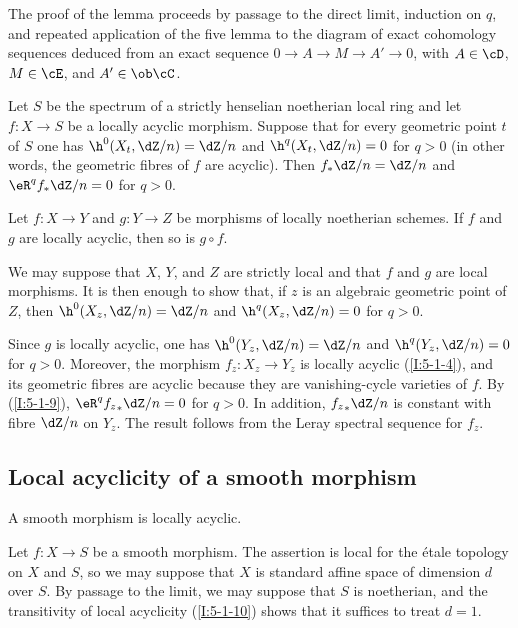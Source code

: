 \documentclass[oneside]{book}
\begin{document}
The proof of the lemma proceeds by passage to the direct limit, induction
on $q$, and repeated application of the five lemma to the diagram of
exact cohomology sequences deduced from an exact sequence
$0\to A\to M\to A'\to0$, with $A\in\cD$, $M\in\cE$, and
$A'\in\ob\cC$.

\begin{corollary}\label{I:5-1-9}
Let $S$ be the spectrum of a strictly henselian noetherian local ring and
let $f:X\to S$ be a locally acyclic morphism. Suppose that for every
geometric point $t$ of $S$ one has $\h^0(X_t,\dZ/n)=\dZ/n$ and
$\h^q(X_t,\dZ/n)=0$ for $q>0$ (in other words, the geometric fibres of
$f$ are acyclic). Then $f_*\dZ/n=\dZ/n$ and
$\eR^qf_*\dZ/n=0$ for $q>0$.
\end{corollary}

\begin{corollary}\label{I:5-1-10}
Let $f:X\to Y$ and $g:Y\to Z$ be morphisms of locally noetherian
schemes. If $f$ and $g$ are locally acyclic, then so is $g\circ f$.
\end{corollary}

We may suppose that $X$, $Y$, and $Z$ are strictly local and that $f$
and $g$ are local morphisms. It is then enough to show that, if $z$ is
an algebraic geometric point of $Z$, then
$\h^0(X_z,\dZ/n)=\dZ/n$ and $\h^q(X_z,\dZ/n)=0$ for $q>0$.

Since $g$ is locally acyclic, one has $\h^0(Y_z,\dZ/n)=\dZ/n$ and
$\h^q(Y_z,\dZ/n)=0$ for $q>0$. Moreover, the morphism
$f_z:X_z\to Y_z$ is locally acyclic (\ref{I:5-1-4}), and its geometric
fibres are acyclic because they are vanishing-cycle varieties of $f$.
By (\ref{I:5-1-9}), $\eR^q{f_z}_*\dZ/n=0$ for $q>0$. In addition,
${f_z}_*\dZ/n$ is constant with fibre $\dZ/n$ on $Y_z$. The result
follows from the Leray spectral sequence for $f_z$.

\subsection{Local acyclicity of a smooth morphism}\label{I:5-2}

\begin{theorem}\label{I:5-2-1}
A smooth morphism is locally acyclic.
\end{theorem}

Let $f:X\to S$ be a smooth morphism. The assertion is local for the étale
topology on $X$ and $S$, so we may suppose that $X$ is standard affine
space of dimension $d$ over $S$. By passage to the limit, we may suppose
that $S$ is noetherian, and the transitivity of local acyclicity
(\ref{I:5-1-10}) shows that it suffices to treat $d=1$.
\end{document}
